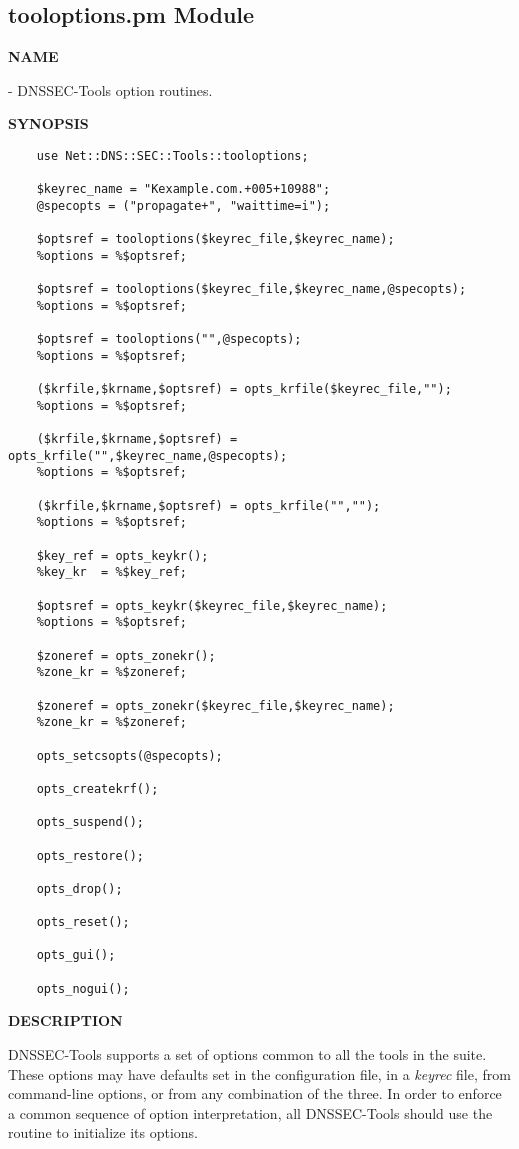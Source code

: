 \clearpage

\subsection{\bf tooloptions.pm Module}

{\bf NAME}

 - DNSSEC-Tools option routines.

{\bf SYNOPSIS}

\begin{verbatim}
    use Net::DNS::SEC::Tools::tooloptions;

    $keyrec_name = "Kexample.com.+005+10988";
    @specopts = ("propagate+", "waittime=i");

    $optsref = tooloptions($keyrec_file,$keyrec_name);
    %options = %$optsref;

    $optsref = tooloptions($keyrec_file,$keyrec_name,@specopts);
    %options = %$optsref;

    $optsref = tooloptions("",@specopts);
    %options = %$optsref;

    ($krfile,$krname,$optsref) = opts_krfile($keyrec_file,"");
    %options = %$optsref;

    ($krfile,$krname,$optsref) = opts_krfile("",$keyrec_name,@specopts);
    %options = %$optsref;

    ($krfile,$krname,$optsref) = opts_krfile("","");
    %options = %$optsref;

    $key_ref = opts_keykr();
    %key_kr  = %$key_ref;

    $optsref = opts_keykr($keyrec_file,$keyrec_name);
    %options = %$optsref;

    $zoneref = opts_zonekr();
    %zone_kr = %$zoneref;

    $zoneref = opts_zonekr($keyrec_file,$keyrec_name);
    %zone_kr = %$zoneref;

    opts_setcsopts(@specopts);

    opts_createkrf();

    opts_suspend();

    opts_restore();

    opts_drop();

    opts_reset();

    opts_gui();

    opts_nogui();
\end{verbatim}

{\bf DESCRIPTION}

DNSSEC-Tools supports a set of options common to all the tools in the suite.
These options may have defaults set in the 
configuration file, in a {\it keyrec} file, from command-line options, or from
any combination of the three.  In order to enforce a common sequence of option
interpretation, all DNSSEC-Tools should use the  routine to
initialize its options.

